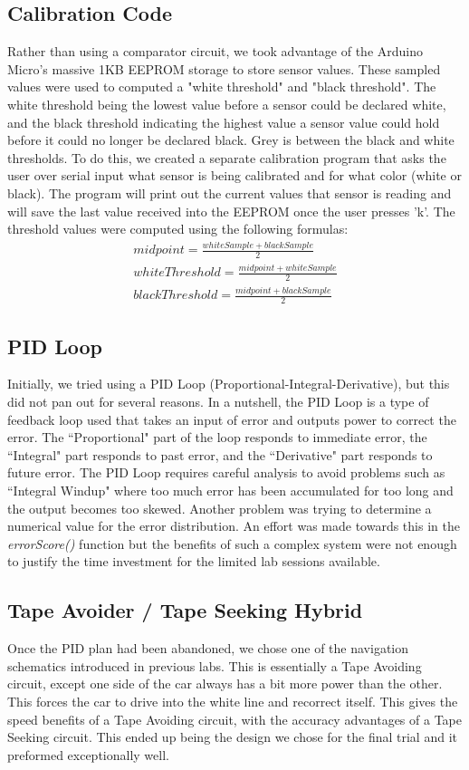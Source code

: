 \documentclass{article}
\begin{document}
\subsection{Calibration Code}
Rather than using a comparator circuit, we took advantage of the Arduino Micro's massive 1KB EEPROM storage to store sensor values. These sampled values were used to computed a "white threshold" and "black threshold". The white threshold being the lowest value before a sensor could be declared white, and the black threshold indicating the highest value a sensor value could hold before it could no longer be declared black. Grey is between the black and white thresholds. To do this, we created a separate calibration program that asks the user over serial input what sensor is being calibrated and for what color (white or black). The program will print out the current values that sensor is reading and will save the last value received into the EEPROM once the user presses 'k'. The threshold values were computed using the following formulas:
\begin{align}
midpoint = \frac{whiteSample + blackSample}{2}\\
whiteThreshold = \frac{midpoint + whiteSample}{2}\\
blackThreshold = \frac{midpoint + blackSample}{2}
\end{align}
\subsection{PID Loop}
Initially, we tried using a PID Loop (Proportional-Integral-Derivative), but this did not pan out for several reasons. In a nutshell, the PID Loop is a type of feedback loop used that takes an input of error and outputs power to correct the error. The ``Proportional" part of the loop responds to immediate error, the ``Integral" part responds to past error, and the ``Derivative" part responds to future error. The PID Loop requires careful analysis to avoid problems such as ``Integral Windup" where too much error has been accumulated for too long and the output becomes too skewed. Another problem was trying to determine a numerical value for the error distribution. An effort was made towards this in the \textit{errorScore()} function but the benefits of such a complex system were not enough to justify the time investment for the limited lab sessions available.
\subsection{Tape Avoider / Tape Seeking Hybrid}
Once the PID plan had been abandoned, we chose one of the navigation schematics introduced in previous labs. This is essentially a Tape Avoiding circuit, except one side of the car always has a bit more power than the other. This forces the car to drive into the white line and recorrect itself. This gives the speed benefits of a Tape Avoiding circuit, with the accuracy advantages of a Tape Seeking circuit. This ended up being the design we chose for the final trial and it preformed exceptionally well. 
\end{document}
